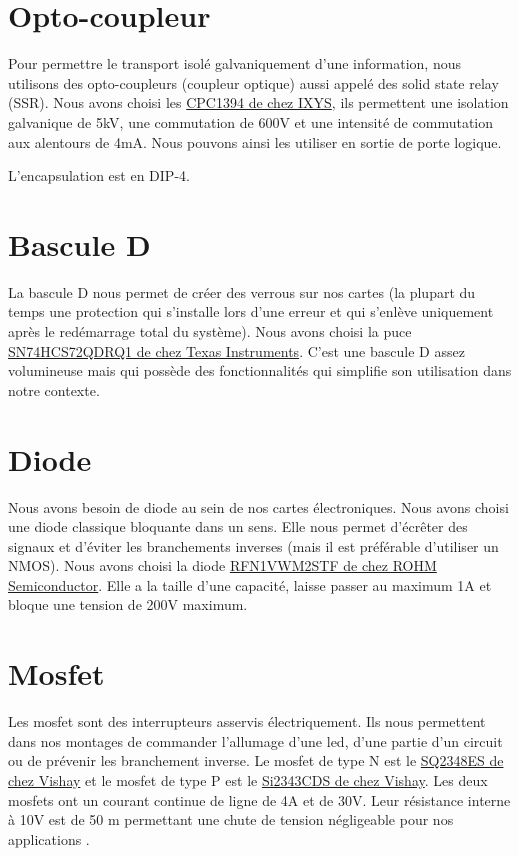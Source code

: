 \documentclass{EPSA-rap-template}
\begin{document}
\section{Opto-coupleur}

Pour permettre le transport isolé galvaniquement d'une information, nous utilisons des opto-coupleurs (coupleur optique) aussi appelé des solid state relay (SSR). Nous avons choisi les \hyperlink{SSR}{CPC1394 de chez IXYS}, ils permettent une isolation galvanique de 5kV, une commutation de 600V et une intensité de commutation aux alentours de 4mA. Nous pouvons ainsi les utiliser en sortie de porte logique. 

L'encapsulation est en DIP-4.

\section{Bascule D}

La bascule D nous permet de créer des verrous sur nos cartes (la plupart du temps une protection qui s'installe lors d'une erreur et qui s'enlève uniquement après le redémarrage total du système). Nous avons choisi la puce \hyperlink{DLatch}{SN74HCS72QDRQ1 de chez Texas Instruments}. C'est une bascule D assez volumineuse mais qui possède des fonctionnalités qui simplifie son utilisation dans notre contexte.

\section{Diode}

Nous avons besoin de diode au sein de nos cartes électroniques.
Nous avons choisi une diode classique bloquante dans un sens. Elle nous permet d'écrêter des signaux et d'éviter les branchements inverses (mais il est préférable d'utiliser un NMOS). Nous avons choisi la diode \hyperlink{Diode}{RFN1VWM2STF de chez ROHM Semiconductor}. Elle a la taille d'une capacité, laisse passer au maximum 1A et bloque une tension de 200V maximum.

\section{Mosfet}

Les mosfet sont des interrupteurs asservis électriquement. Ils nous permettent dans nos montages de commander l'allumage d'une led, d'une partie d'un circuit ou de prévenir les branchement inverse. Le mosfet de type N est le \hyperlink{NMOS}{ SQ2348ES de chez Vishay} et le mosfet de type P est le \hyperlink{PMOS}{ Si2343CDS de chez Vishay}. Les deux mosfets ont un courant continue de ligne de 4A et de 30V. Leur résistance interne à 10V est de 50 m \Omega permettant une chute de tension négligeable pour nos applications .
\end{document}
